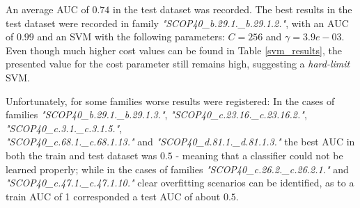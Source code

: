 \documentclass[11pt]{article}
\begin{document}
An average AUC of $0.74$ in the test dataset was recorded. The best results in the test dataset were recorded in family \emph{"SCOP40\_b.29.1.\_b.29.1.2."}, with an AUC of $0.99$ and an SVM with the following parameters: $C = 256$ and $\gamma = 3.9e-03$. Even though much higher cost values can be found in Table \ref{svm_results}, the presented value for the cost parameter still remains high, suggesting a \emph{hard-limit} SVM.

Unfortunately, for some families worse results were registered: In the cases of families \emph{"SCOP40\_b.29.1.\_b.29.1.3."}, \emph{"SCOP40\_c.23.16.\_c.23.16.2."}, \emph{"SCOP40\_c.3.1.\_c.3.1.5."},\\\emph{"SCOP40\_c.68.1.\_c.68.1.13."} and \emph{"SCOP40\_d.81.1.\_d.81.1.3."} the best AUC in both the train and test dataset was $0.5$ - meaning that a classifier could not be learned properly; while in the cases of families \emph{"SCOP40\_c.26.2.\_c.26.2.1."} and \emph{"SCOP40\_c.47.1.\_c.47.1.10."} clear overfitting scenarios can be identified, as to a train AUC of 1 corresponded a test AUC of about $0.5$.
\end{document}
